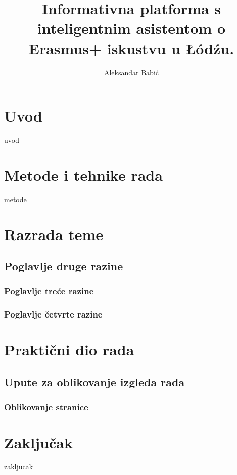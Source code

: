 \documentclass[]{foi}
\title{Informativna platforma s inteligentnim asistentom o Erasmus+ iskustvu u \L\'{o}d\'{z}u.}
\author{Aleksandar Babić}
\begin{document}
\maketitle

\tableofcontents

\makeatletter {} \makeatother
\pagestyle{plain}



\chapter{Uvod}

uvod



\chapter{Metode i tehnike rada}

metode



\chapter{Razrada teme}





\section{Poglavlje druge razine }





\subsection{Poglavlje treće razine}




\subsection{Poglavlje četvrte razine}





\chapter{Praktični dio rada}




\section{Upute za oblikovanje izgleda rada}

\subsection{Oblikovanje stranice}



\chapter{Zaključak}

zakljucak 

\makebackmatter
\end{document}
